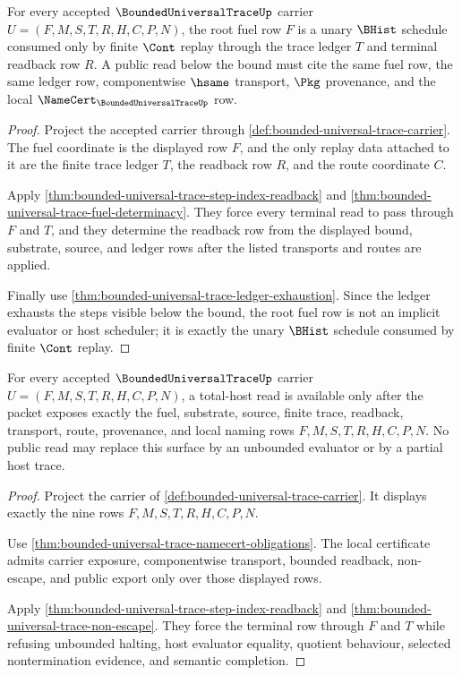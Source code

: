 \begin{theorem}
\label{thm:bounded-universal-trace-root-fuel-schedule}
For every accepted $\BoundedUniversalTraceUp$ carrier
$U=(F,M,S,T,R,H,C,P,N)$, the root fuel row $F$ is a unary $\BHist$
schedule consumed only by finite $\Cont$ replay through the trace ledger $T$
and terminal readback row $R$. A public read below the bound must cite the
same fuel row, the same ledger row, componentwise $\hsame$ transport, $\Pkg$
provenance, and the local $\NameCert_{\BoundedUniversalTraceUp}$ row.
\end{theorem}
\begin{proof}
Project the accepted carrier through
\autoref{def:bounded-universal-trace-carrier}. The fuel coordinate is the
displayed row $F$, and the only replay data attached to it are the finite
trace ledger $T$, the readback row $R$, and the route coordinate $C$.

Apply \autoref{thm:bounded-universal-trace-step-index-readback} and
\autoref{thm:bounded-universal-trace-fuel-determinacy}. They force every
terminal read to pass through $F$ and $T$, and they determine the readback row
from the displayed bound, substrate, source, and ledger rows after the listed
transports and routes are applied.

Finally use \autoref{thm:bounded-universal-trace-ledger-exhaustion}. Since
the ledger exhausts the steps visible below the bound, the root fuel row is
not an implicit evaluator or host scheduler; it is exactly the unary
$\BHist$ schedule consumed by finite $\Cont$ replay.
\end{proof}

\begin{theorem}
\label{thm:bounded-universal-trace-obligation-surface-lock}
For every accepted $\BoundedUniversalTraceUp$ carrier $U=(F,M,S,T,R,H,C,P,N)$, a total-host read is available only after the packet exposes exactly the fuel, substrate, source, finite trace, readback, transport, route, provenance, and local naming rows $F,M,S,T,R,H,C,P,N$. No public read may replace this surface by an unbounded evaluator or by a partial host trace.
\end{theorem}
\begin{proof}
Project the carrier of \autoref{def:bounded-universal-trace-carrier}. It displays exactly the nine rows $F,M,S,T,R,H,C,P,N$.

Use \autoref{thm:bounded-universal-trace-namecert-obligations}. The local certificate admits carrier exposure, componentwise transport, bounded readback, non-escape, and public export only over those displayed rows.

Apply \autoref{thm:bounded-universal-trace-step-index-readback} and \autoref{thm:bounded-universal-trace-non-escape}. They force the terminal row through $F$ and $T$ while refusing unbounded halting, host evaluator equality, quotient behaviour, selected nontermination evidence, and semantic completion.
\end{proof}

